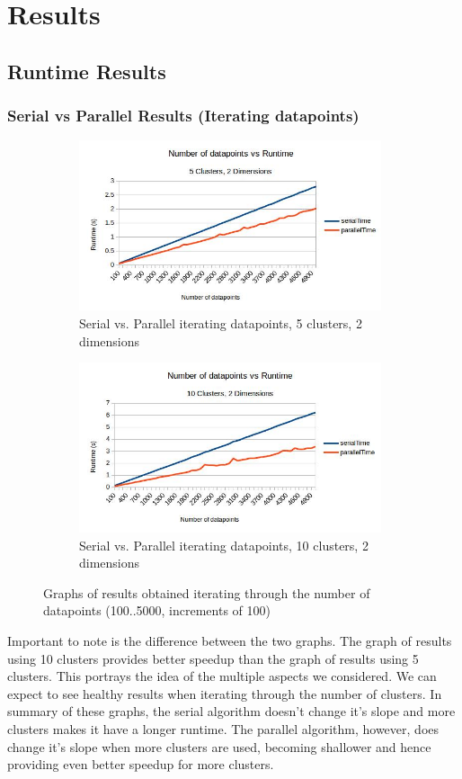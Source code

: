 \documentclass{article}
\begin{document}
\newpage
\section{Results}
\subsection{Runtime Results}
\subsubsection{Serial vs Parallel Results (Iterating datapoints)}
\begin{figure}[h!]
    \begin{subfigure}{0.5\textwidth}
        \includegraphics[width=0.9\linewidth, height=5cm]{Pictures/datapoints1.jpg}
        \caption{Serial vs. Parallel iterating datapoints, 5 clusters, 2 dimensions}
    \end{subfigure}
    \begin{subfigure}{0.5\textwidth}
        \includegraphics[width=0.9\linewidth, height=5cm]{Pictures/datapoints2.jpg}
        \caption{Serial vs. Parallel iterating datapoints, 10 clusters, 2 dimensions}
    \end{subfigure}
\caption{Graphs of results obtained iterating through the number of datapoints (100..5000, increments of 100)}
\end{figure}

Important to note is the difference between the two graphs. The graph of results using 10 clusters provides better speedup than the graph of results using 5 clusters. This portrays the idea of the multiple aspects we considered. We can expect to see healthy results when iterating through the number of clusters. In summary of these graphs, the serial algorithm doesn't change it's slope and more clusters makes it have a longer runtime. The parallel algorithm, however, does change it's slope when more clusters are used, becoming shallower and hence providing even better speedup for more clusters.
\end{document}
